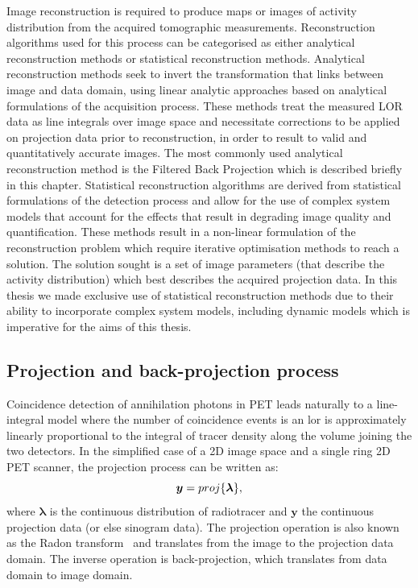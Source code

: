 Image reconstruction is required to produce maps or images of activity distribution from the acquired tomographic measurements. Reconstruction algorithms used for this process can be categorised as either analytical reconstruction methods or statistical reconstruction methods.  
Analytical reconstruction methods seek to invert the transformation that links between image and data domain, using linear analytic approaches based on analytical formulations of the acquisition process. These methods treat the measured LOR data as line integrals over image space and necessitate corrections to be applied on projection data prior to reconstruction, in order to result to valid and quantitatively accurate images. The most commonly used analytical reconstruction method is the Filtered Back Projection which is described briefly in this chapter. 
Statistical reconstruction algorithms are derived from statistical formulations of the detection process and allow for the use of complex system models that account for the effects that result in degrading image quality and quantification.  These methods result in a non-linear formulation of the reconstruction problem which require iterative optimisation methods to reach a solution. The solution sought is a set of image parameters (that describe the activity distribution) which best describes the acquired projection data. 
In this thesis we made exclusive use of statistical reconstruction methods due to their ability to incorporate complex system models, including dynamic models which is imperative for the aims of this thesis.


\subsection{Projection and back-projection process}
Coincidence detection of annihilation photons in PET leads naturally to a line-integral model where the number of coincidence events is an \gls{lor} is approximately linearly proportional to the integral of tracer density along the volume joining the two detectors. 
In the simplified case of a 2D image space and a single ring 2D PET scanner, the projection process can be written as:
\begin{equation}
   \bm y = proj\{\bm{\lambda}\}  \\, 
  \label{eqn:Radon}
\end{equation}
where $\bm{\lambda}$ is the continuous distribution of radiotracer and $\bm{y}$ the continuous projection data (or else sinogram data). 
The projection operation is also known as the Radon transform~\cite{radon1917} and translates from the image to the projection data domain. 
The inverse operation is back-projection, which translates from data domain to image domain.

